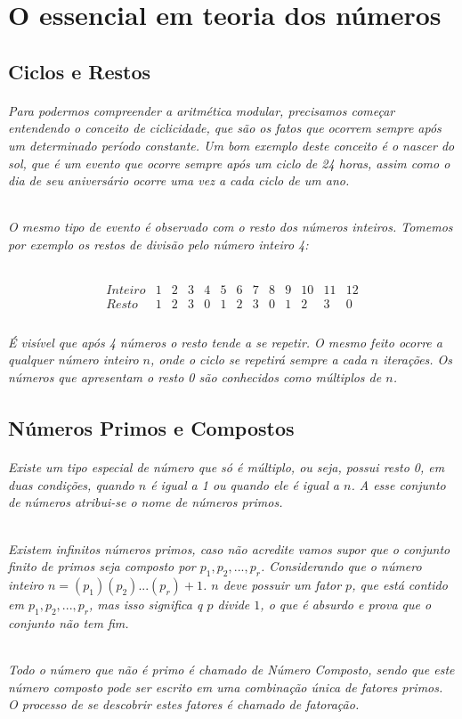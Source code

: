 \chapter {O essencial em teoria dos n\'umeros}
\label{Num}

\section{Ciclos e Restos}	
\subparagraph{
Para podermos compreender a aritm\'etica modular, precisamos come\c{c}ar entendendo o conceito de ciclicidade, que s\~ao os fatos que ocorrem sempre ap\'os um determinado per\'iodo constante. Um bom exemplo deste conceito \'e o nascer do sol, que \'e um evento que ocorre sempre ap\'os um ciclo de {24} horas, assim como o dia de seu anivers\'ario ocorre uma vez a cada ciclo de um ano.
}
\subparagraph{
O mesmo tipo de evento \'e observado com o resto dos n\'umeros inteiros. Tomemos por exemplo os restos de divis\~ao pelo n\'umero inteiro {4}:
}

\[
\begin{array}{ccccccccccccc}
  {Inteiro} & 1 & 2 & 3 & 4 & 5 & 6 & 7 & 8 & 9 & 10 &  11 & 12 \\  
	{Resto} & 1 & 2 & 3 & 0 & 1 & 2 & 3 & 0 & 1 & 2  &  3 & 0 \\ 
\end{array}
\]

\subparagraph{
\'E vis\'ivel que ap\'os {4} n\'umeros o resto tende a se repetir. O mesmo feito ocorre a qualquer n\'umero inteiro $n$, onde o ciclo se repetir\'a sempre a cada $n$ itera\c{c}\~oes. Os n\'umeros que apresentam o resto {0} s\~ao conhecidos como m\'ultiplos de $n$.
}

\section{N\'{u}meros Primos e Compostos}

\subparagraph{
Existe um tipo especial de n\'umero que s\'o \'e m\'ultiplo, ou seja, possui resto {0}, em duas condi\c{c}\~oes, quando $n$ \'e igual a {1} ou quando ele \'e igual a $n$. A esse conjunto de n\'umeros atribui-se o nome de \textit{n\'umeros primos}.
}
\subparagraph{
Existem infinitos n\'umeros primos, caso n\~ao acredite vamos supor que o conjunto finito de primos seja composto por $p_{1},  p_{2}, ..., p_{r} $. Considerando que o n\'umero inteiro $n=(p_{1})(p_{2})...(p_{r}) + 1$. $n$ deve possuir um fator $p$, que est\'a contido em $p_{1},  p_{2}, ..., p_{r} $, mas isso significa q $p$ divide $1$, o que \'e absurdo e prova que o conjunto n\~ao tem fim.
}
\subparagraph{
Todo o n\'umero que n\~ao \'e primo \'e chamado de \textit{N\'umero Composto}, sendo que este n\'umero composto pode ser escrito em uma combina\c{c}\~ao \'unica de fatores primos. O processo de se descobrir estes fatores \'e chamado de \textit{fatora\c{c}\~ao}.
}

